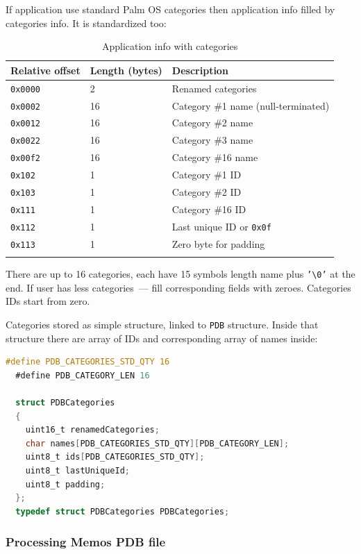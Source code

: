 \documentclass[a4paper,12pt,oneside]{scrartcl}
\begin{document}
If application use standard Palm OS categories then application info filled by
categories info. It is standardized too:
\begin{longtable}{|p{2cm}|p{4cm}|p{7cm}|}
  \hline
  \textbf{Relative offset} & \textbf{Length (bytes)} & \textbf{Description} \\
  \hline
  \texttt{0x0000} & 2 & Renamed categories \\
  \hline
  \texttt{0x0002} & 16 & Category \#1 name (null-terminated) \\
  \hline
  \texttt{0x0012} & 16 & Category \#2 name \\
  \hline
  \texttt{0x0022} & 16 & Category \#3 name \\
  \hline
  \hline
  \texttt{0x00f2} & 16 & Category \#16 name \\
  \hline
  \texttt{0x102} & 1 & Category \#1 ID \\
  \hline
  \texttt{0x103} & 1 & Category \#2 ID \\
  \hline
  \hline
  \texttt{0x111} & 1 & Category \#16 ID \\
  \hline
  \texttt{0x112} & 1 & Last unique ID or \texttt{0x0f} \\
  \hline
  \texttt{0x113} & 1 & Zero byte for padding \\
  \hline
  \caption{Application info with categories}
  \label{tab:application-info-categories}
\end{longtable}

There are up to 16 categories, each have 15 symbols length name plus
\texttt{'\textbackslash{}0'} at the end. If user has less categories~--- fill
corresponding fields with zeroes. Categories IDs start from zero.

Categories stored as simple structure, linked to \texttt{PDB} structure. Inside
that structure there are array of IDs and corresponding array of names inside:
\begin{lstlisting}[language=C, caption={C structure to store categories data}]
  #define PDB_CATEGORIES_STD_QTY 16
  #define PDB_CATEGORY_LEN 16

  struct PDBCategories
  {
	uint16_t renamedCategories;
	char names[PDB_CATEGORIES_STD_QTY][PDB_CATEGORY_LEN];
	uint8_t ids[PDB_CATEGORIES_STD_QTY];
	uint8_t lastUniqueId;
	uint8_t padding;
  };
  typedef struct PDBCategories PDBCategories;
\end{lstlisting}

\subsubsection{Processing Memos PDB file}
\label{sec:processing-memos-pdb}
\end{document}
